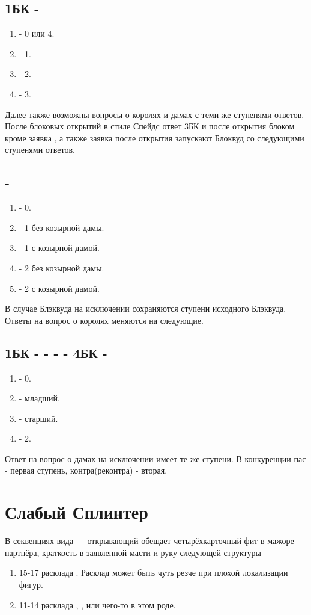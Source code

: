 \documentclass{article}
\begin{document}
\subsection{1БК - }
\begin{enumerate}
    \item[\di{4}] - 0 или 4.
    \item[\he{4}] - 1.
    \item[\sp{4}] - 2.
    \item[4БК] - 3.
\end{enumerate}
Далее также возможны вопросы о королях и дамах с теми же ступенями ответов. После блоковых открытий в стиле Спейдс ответ 3БК и после открытия блоком кроме  заявка , а также заявка  после открытия  запускают Блоквуд со следующими ступенями ответов.
\subsection{ - }
\begin{enumerate}
    \item[\di{4}] - 0.
    \item[\he{4}] - 1 без козырной дамы.
    \item[\sp{4}] - 1 с козырной дамой.
    \item[4БК] - 2 без козырной дамы.
    \item[\cl{5}] - 2 с козырной дамой.
\end{enumerate}
В случае Блэквуда на исключении сохраняются ступени исходного Блэквуда. Ответы на вопрос о королях меняются на следующие.
\subsection{1БК -  -  -  - 4БК - }
\begin{enumerate}
    \item[\he{5}] - 0.
    \item[\sp{5}] - младший.
    \item[5БК] - старший.
    \item[\cl{6}] - 2.
\end{enumerate}
Ответ на вопрос о дамах на исключении имеет те же ступени. В конкуренции пас - первая ступень, контра(реконтра) - вторая. 
\section{Слабый Сплинтер}
В секвенциях вида  -  -  открывающий обещает четырёхкарточный фит в мажоре партнёра, краткость в заявленной масти и руку следующей структуры
\begin{enumerate}
    \item 15-17 расклада . Расклад может быть чуть резче при плохой локализации фигур.
    \item 11-14 расклада , ,  или чего-то в этом роде.
\end{enumerate}
\end{document}
